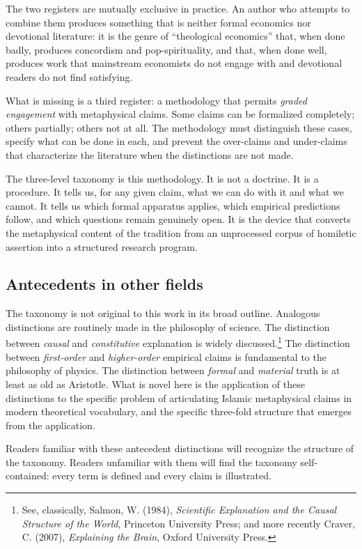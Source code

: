 The two registers are mutually exclusive in practice. An author who
attempts to combine them produces something that is neither
formal economics nor devotional literature: it is the genre of
``theological economics'' that, when done badly, produces concordism
and pop-spirituality, and that, when done well, produces work that
mainstream economists do not engage with and devotional readers do
not find satisfying.

What is missing is a third register: a methodology that permits
\emph{graded engagement} with metaphysical claims. Some claims can
be formalized completely; others partially; others not at all. The
methodology must distinguish these cases, specify what can be done
in each, and prevent the over-claims and under-claims that
characterize the literature when the distinctions are not made.

The three-level taxonomy is this methodology. It is not a doctrine.
It is a procedure. It tells us, for any given claim, what we can do
with it and what we cannot. It tells us which formal apparatus
applies, which empirical predictions follow, and which questions
remain genuinely open. It is the device that converts the
metaphysical content of the tradition from an unprocessed corpus of
homiletic assertion into a structured research program.

\subsection{Antecedents in other fields}

The taxonomy is not original to this work in its broad outline.
Analogous distinctions are routinely made in the philosophy of
science. The distinction between \emph{causal} and \emph{constitutive}
explanation is widely discussed.\footnote{See, classically, Salmon, W.
(1984), \emph{Scientific Explanation and the Causal Structure of the
World}, Princeton University Press; and more recently Craver, C.
(2007), \emph{Explaining the Brain}, Oxford University Press.} The
distinction between \emph{first-order} and \emph{higher-order}
empirical claims is fundamental to the philosophy of physics. The
distinction between \emph{formal} and \emph{material} truth is at
least as old as Aristotle. What is novel here is the application of
these distinctions to the specific problem of articulating Islamic
metaphysical claims in modern theoretical vocabulary, and the
specific three-fold structure that emerges from the application.

Readers familiar with these antecedent distinctions will recognize
the structure of the taxonomy. Readers unfamiliar with them will
find the taxonomy self-contained: every term is defined and every
claim is illustrated.

